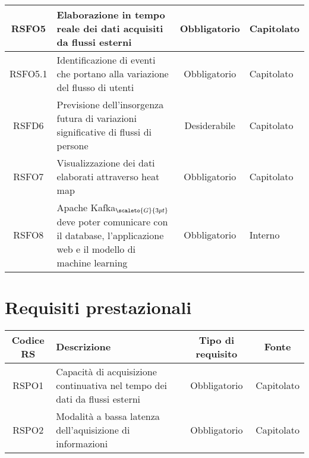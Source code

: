 {\begin{center}
\begin{tabularx}{\textwidth}{ |c|X|c|X| }
			\hline
			RSFO5 & Elaborazione in tempo reale dei dati acquisiti da flussi esterni & Obbligatorio & Capitolato  \\
			\hline
			RSFO5.1 & Identificazione di eventi che portano alla variazione del flusso di utenti & Obbligatorio & Capitolato  \\
			\hline
			RSFD6 & Previsione dell'insorgenza futura di variazioni significative di flussi di persone & Desiderabile & Capitolato  \\
			\hline
			RSFO7 & Visualizzazione dei dati elaborati attraverso heat map & Obbligatorio & Capitolato  \\
		\hline
			RSFO8 & Apache Kafka$_{\scaleto{G}{3pt}}$ deve poter comunicare con il database, l'applicazione web e il modello di machine learning  & Obbligatorio &  Interno \\		
			\hline
	\end{tabularx}
	\end{center}

\section{Requisiti prestazionali}
\begin{center}
	\renewcommand{\arraystretch}{1.4}
	\begin{tabularx}{\textwidth}{ |c|X|c|c| }
		\hline
		\rowcolor{Melon}
		\textbf{Codice RS} & \textbf{Descrizione} & \textbf{Tipo di requisito} & \textbf{Fonte} \\
		\hline
		RSPO1 & Capacità di acquisizione continuativa nel tempo dei dati da flussi esterni & Obbligatorio & Capitolato  \\
		\hline
		RSPO2 & Modalità a bassa latenza dell'aquisizione di informazioni & Obbligatorio & Capitolato \\

	\end{tabularx}
\end{center}

}

